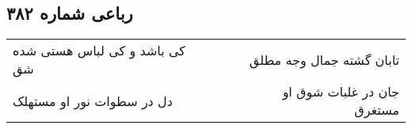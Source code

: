 \begin{center}
\section*{رباعی شماره ۳۸۲}
\label{sec:sh382}
\begin{longtable}{l p{0.5cm} r}
کی باشد و کی لباس هستی شده شق
&&
تابان گشته جمال وجه مطلق
\\
دل در سطوات نور او مستهلک
&&
جان در غلبات شوق او مستغرق
\\
\end{longtable}
\end{center}
